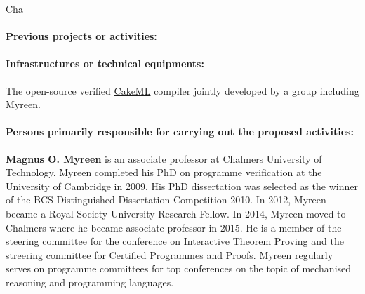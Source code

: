 \begin{sitedescription}{Cha}
\paragraph*{Previous projects or activities:}


\begin{compactitem}
\item 
\end{compactitem}

\paragraph*{Infrastructures or technical equipments:}


\begin{compactitem}
\item The open-source verified \href{https://cakeml.org/}{CakeML}
  compiler jointly developed by a group including Myreen.
\end{compactitem}

\paragraph*{Persons primarily responsible for carrying out the proposed activities:}

\begin{compactitem}
\item \textbf{Magnus O. Myreen} is an associate professor at Chalmers
  University of Technology.  Myreen completed his PhD on programme
  verification at the University of Cambridge in 2009. His PhD
  dissertation was selected as the winner of the BCS Distinguished
  Dissertation Competition 2010. In 2012, Myreen became a Royal
  Society University Research Fellow. In 2014, Myreen moved to
  Chalmers where he became associate professor in 2015.  He is a
  member of the steering committee for the conference on Interactive
  Theorem Proving and the streering committee for Certified Programmes
  and Proofs.  Myreen regularly serves on programme committees for top
  conferences on the topic of mechanised reasoning and programming
  languages.
\end{compactitem}

\end{sitedescription}

